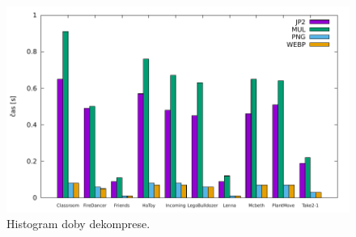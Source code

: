 \documentclass[a4paper, 11pt, titlepage]{article}
\begin{document}
	\begin{figure}[h!]
	\centering
	\includegraphics[width=15cm]{decompress_time.pdf}
	\caption{Histogram doby dekomprese.}
	\label{fig:decompress}
	\end{figure}
\end{document}
